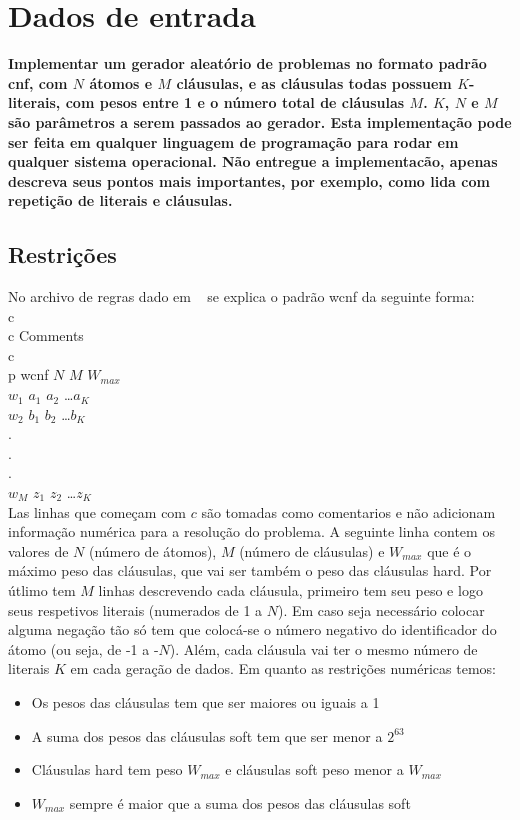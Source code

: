 \section{Dados de entrada}
\textbf{Implementar um gerador aleatório de problemas no formato padrão cnf, com $N$ átomos e $M$ cláusulas, e as cláusulas todas possuem $K$-literais, com pesos entre 1 e o número total de cláusulas $M$. $K$, $N$ e $M$ são parâmetros a serem passados ao gerador. Esta implementação pode ser feita em qualquer linguagem de programação para rodar em qualquer sistema operacional. Não entregue a implementacão, apenas descreva seus pontos mais importantes, por exemplo, como lida com repetição de literais e cláusulas.}

\subsection{Restrições}
\label{subsec:restricoes}
	No archivo de regras dado em ~\cite{ConferenceRules14} se explica o padrão wcnf da seguinte forma: \\
		c \\
		c Comments \\
		c \\
		p wcnf $N$ $M$ $W_{max}$ \\
		$w_1$ $a_1$ $a_2$ \ldots $a_K$ \\
		$w_2$ $b_1$ $b_2$ \ldots $b_K$ \\
		. \\
		. \\
		. \\
		$w_M$ $z_1$ $z_2$ \ldots $z_K$ \\
	Las linhas que começam com $c$ são tomadas como comentarios e não adicionam informação numérica para a resolução do problema. A seguinte linha contem os valores de $N$ (número de átomos), $M$ (número de cláusulas) e $W_{max}$ que é o máximo peso das cláusulas, que vai ser também o peso das cláusulas hard. Por útlimo tem $M$ linhas descrevendo cada cláusula, primeiro tem seu peso e logo seus respetivos literais (numerados de 1 a $N$). Em caso seja necessário colocar alguma negação tão só tem que colocá-se o número negativo do identificador do átomo (ou seja, de -1 a -$N$). Além, cada cláusula vai ter o mesmo número de literais $K$ em cada geração de dados. Em quanto as restrições numéricas temos:
	\begin{itemize}
		\item Os pesos das cláusulas tem que ser maiores ou iguais a 1
		\item A suma dos pesos das cláusulas soft tem que ser menor a $2^{63}$
		\item Cláusulas hard tem peso $W_{max}$ e cláusulas soft peso menor a $W_{max}$
		\item $W_{max}$ sempre é maior que a suma dos pesos das cláusulas soft
	\end{itemize}
	

